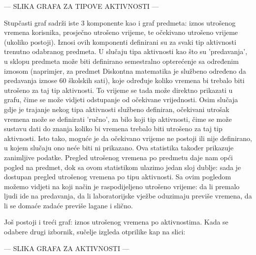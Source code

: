 \documentclass[times, utf8, zavrsni]{fer}
\begin{document}
--- SLIKA GRAFA ZA TIPOVE AKTIVNOSTI ---

Stupčasti graf sadrži iste 3 komponente kao i graf predmeta: iznos utrošenog vremena korisnika, prosječno utrošeno vrijeme, te očekivano utrošeno vrijeme (ukoliko postoji). Iznosi ovih komponenti definirani su za svaki tip aktivnosti trenutno odabranog predmeta. U slučaju tipa aktivnosti kao što su 'predavanja', u sklopu predmeta može biti definirano semestralno opterećenje sa određenim iznosom (naprimjer, za predmet Diskontna matematika je službeno određeno da predavanja iznose 60 školskih sati), koje određuje koliko vremena bi trebalo biti utrošeno za taj tip aktivnosti. To vrijeme se tada može direktno prikazati u grafu, čime se može vidjeti odstupanje od očekivane vrijednosti. Osim slučaja gdje je trajanje nekog tipa aktivnosti službeno definiran, očekivani utrošak vremena može se definirati 'ručno', za bilo koji tip aktivnosti, čime se može sustavu dati do znanja koliko bi vremena trebalo biti utrošeno za taj tip aktivnosti. Isto tako, moguće je da očekivano vrijeme ne postoji ili nije definirano, u kojem slučaju ono neće biti ni prikazano.
Ova statistika također prikazuje zanimljive podatke. Pregled utrošenog vremena po predmetu daje nam opći pogled na predmet, dok sa ovom statistikom ulazimo jedan sloj dublje: sada je dostupan pregled utrošenog vremena po tipu aktivnosti. Sa ovim pogledom možemo vidjeti na koji način je raspodijeljeno utrošeno vrijeme: da li premalo ljudi ide na predavanja, da li laboratorijske vježbe oduzimaju previše vremena, da li se domaće zadaće previše lagane i slično.

Još postoji i treći graf: iznos utrošenog vremena po aktivnostima. Kada se odabere drugi izbornik, sučelje izgleda otprilike kap na slici:

--- SLIKA GRAFA ZA AKTIVNOSTI ---
\end{document}
